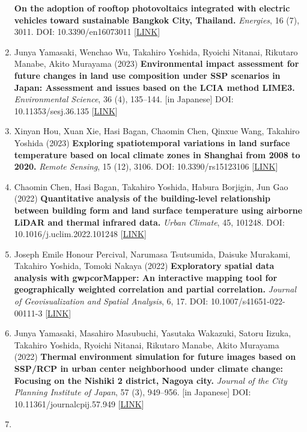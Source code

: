 \documentclass[
]{book}
\begin{document}
\begin{enumerate}
  \textbf{On the adoption of rooftop photovoltaics integrated with electric vehicles toward sustainable Bangkok City, Thailand.}
  \emph{Energies}, 16 (7), 3011.
  DOI: 10.3390/en16073011 {[}\href{https://www.mdpi.com/1996-1073/16/7/3011}{LINK}{]}
\item
  Junya Yamasaki, Wenchao Wu, Takahiro Yoshida, Ryoichi Nitanai, Rikutaro Manabe, Akito Murayama (2023)
  \textbf{Environmental impact assessment for future changes in land use composition under SSP scenarios in Japan: Assessment and issues based on the LCIA method LIME3.}
  \emph{Environmental Science}, 36 (4), 135--144. {[}in Japanese{]}
  DOI: 10.11353/sesj.36.135 {[}\href{https://doi.org/10.11353/sesj.36.135}{LINK}{]}
\item
  Xinyan Hou, Xuan Xie, Hasi Bagan, Chaomin Chen, Qinxue Wang,
  Takahiro Yoshida (2023)
  \textbf{Exploring spatiotemporal variations in land surface temperature based on local climate zones in Shanghai from 2008 to 2020.}
  \emph{Remote Sensing}, 15 (12), 3106.
  DOI: 10.3390/rs15123106 {[}\href{https://www.mdpi.com/2072-4292/15/12/3106}{LINK}{]}
\item
  Chaomin Chen, Hasi Bagan, Takahiro Yoshida, Habura Borjigin, Jun Gao (2022)
  \textbf{Quantitative analysis of the building-level relationship between building form and land surface temperature using airborne LiDAR and thermal infrared data.}
  \emph{Urban Climate}, 45, 101248.
  DOI: 10.1016/j.uclim.2022.101248 {[}\href{https://doi.org/10.1016/j.uclim.2022.101248}{LINK}{]}
\item
  Joseph Emile Honour Percival, Narumasa Tsutsumida, Daisuke Murakami, Takahiro Yoshida, Tomoki Nakaya (2022)
  \textbf{Exploratory spatial data analysis with gwpcorMapper: An interactive mapping tool for geographically weighted correlation and partial correlation.}
  \emph{Journal of Geovisualization and Spatial Analysis}, 6, 17.
  DOI: 10.1007/s41651-022-00111-3 {[}\href{https://link.springer.com/article/10.1007/s41651-022-00111-3}{LINK}{]}
\item
  Junya Yamasaki, Masahiro Masubuchi, Yasutaka Wakazuki, Satoru Iizuka, Takahiro Yoshida, Ryoichi Nitanai, Rikutaro Manabe, Akito Murayama (2022)
  \textbf{Thermal environment simulation for future images based on SSP/RCP in urban center neighborhood under climate change: Focusing on the Nishiki 2 district, Nagoya city.}
  \emph{Journal of the City Planning Institute of Japan}, 57 (3), 949--956. {[}in Japanese{]}
  DOI: 10.11361/journalcpij.57.949 {[}\href{https://doi.org/10.11361/journalcpij.57.949}{LINK}{]}
\item

\end{enumerate}
\end{document}
